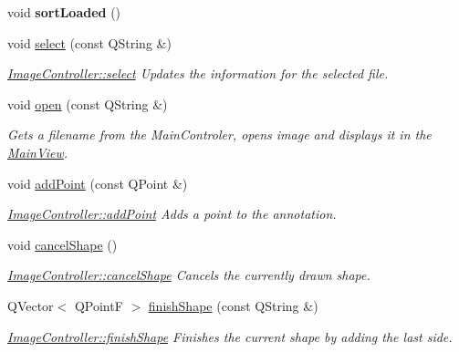 \begin{DoxyCompactItemize}
\mbox{\label{classImageController_aa27c122f5fa43ed32984077cc0f1871a}} 
void {\bfseries sort\+Loaded} ()
\item 
void \hyperlink{classImageController_a81d44568235778fe6d5dc14fb377499a}{select} (const Q\+String \&)
\begin{DoxyCompactList}\small\item\em \hyperlink{classImageController_a81d44568235778fe6d5dc14fb377499a}{Image\+Controller\+::select} Updates the information for the selected file. \end{DoxyCompactList}\item 
void \hyperlink{classImageController_a3f5976d87977aa1cda7b5a9a7ad0f03b}{open} (const Q\+String \&)
\begin{DoxyCompactList}\small\item\em Gets a filename from the Main\+Controler, opens image and displays it in the \hyperlink{classMainView}{Main\+View}. \end{DoxyCompactList}\item 
void \hyperlink{classImageController_adaade0712de089f06a9a267399004cab}{add\+Point} (const Q\+Point \&)
\begin{DoxyCompactList}\small\item\em \hyperlink{classImageController_adaade0712de089f06a9a267399004cab}{Image\+Controller\+::add\+Point} Adds a point to the annotation. \end{DoxyCompactList}\item 
\mbox{\label{classImageController_a399eff924a1b3b7cc0034ea1a0face7e}} 
void \hyperlink{classImageController_a399eff924a1b3b7cc0034ea1a0face7e}{cancel\+Shape} ()
\begin{DoxyCompactList}\small\item\em \hyperlink{classImageController_a399eff924a1b3b7cc0034ea1a0face7e}{Image\+Controller\+::cancel\+Shape} Cancels the currently drawn shape. \end{DoxyCompactList}\item 
Q\+Vector$<$ Q\+PointF $>$ \hyperlink{classImageController_aaabc0506bd421fc0abf5b06ffc1c7032}{finish\+Shape} (const Q\+String \&)
\begin{DoxyCompactList}\small\item\em \hyperlink{classImageController_aaabc0506bd421fc0abf5b06ffc1c7032}{Image\+Controller\+::finish\+Shape} Finishes the current shape by adding the last side. \end{DoxyCompactList}\item 

\end{DoxyCompactItemize}
